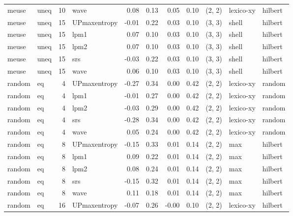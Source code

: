 \begin{tabular}{llrlrrrrlll}
 meuse &  uneq & 10 &         wave &  0.08 &     0.13 &   0.05 &       0.10 & (2, 2) &   lexico-xy &    hilbert \\
 meuse &  uneq & 15 & UPmaxentropy & -0.01 &     0.22 &   0.03 &       0.10 & (3, 3) &       shell &    hilbert \\
 meuse &  uneq & 15 &         lpm1 &  0.07 &     0.10 &   0.03 &       0.10 & (3, 3) &       shell &    hilbert \\
 meuse &  uneq & 15 &         lpm2 &  0.07 &     0.10 &   0.03 &       0.10 & (3, 3) &       shell &    hilbert \\
 meuse &  uneq & 15 &          srs & -0.03 &     0.22 &   0.03 &       0.10 & (3, 3) &       shell &    hilbert \\
 meuse &  uneq & 15 &         wave &  0.06 &     0.10 &   0.03 &       0.10 & (3, 3) &       shell &    hilbert \\
random &    eq &  4 & UPmaxentropy & -0.27 &     0.34 &   0.00 &       0.42 & (2, 2) &   lexico-xy &     random \\
random &    eq &  4 &         lpm1 & -0.01 &     0.27 &   0.00 &       0.42 & (2, 2) &   lexico-xy &     random \\
random &    eq &  4 &         lpm2 & -0.03 &     0.29 &   0.00 &       0.42 & (2, 2) &   lexico-xy &     random \\
random &    eq &  4 &          srs & -0.28 &     0.34 &   0.00 &       0.42 & (2, 2) &   lexico-xy &     random \\
random &    eq &  4 &         wave &  0.05 &     0.24 &   0.00 &       0.42 & (2, 2) &   lexico-xy &     random \\
random &    eq &  8 & UPmaxentropy & -0.15 &     0.33 &   0.01 &       0.14 & (2, 2) &         max &    hilbert \\
random &    eq &  8 &         lpm1 &  0.09 &     0.22 &   0.01 &       0.14 & (2, 2) &         max &    hilbert \\
random &    eq &  8 &         lpm2 &  0.08 &     0.24 &   0.01 &       0.14 & (2, 2) &         max &    hilbert \\
random &    eq &  8 &          srs & -0.15 &     0.32 &   0.01 &       0.14 & (2, 2) &         max &    hilbert \\
random &    eq &  8 &         wave &  0.11 &     0.18 &   0.01 &       0.14 & (2, 2) &         max &    hilbert \\
random &    eq & 16 & UPmaxentropy & -0.07 &     0.26 &  -0.00 &       0.10 & (2, 2) &   lexico-xy &    hilbert \\

\end{tabular}
